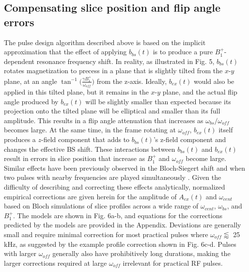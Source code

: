 \documentclass{article}
\newcommand{\bext}{b_{ex}(t)}
\newcommand{\bbst}{b_{bs}(t)}
\begin{document}
\subsection{Compensating slice position and flip angle errors}
The pulse design algorithm described above is based on the implicit approximation
that the effect of applying $\bbst$ is to produce a pure $B_1^+$-dependent 
resonance frequency shift.
In reality, as illustrated in Fig. 5, 
$\bbst$ rotates magnetization to precess in a plane that is slightly tilted from 
the $x$-$y$ plane, 
at an angle $\tan^{-1}\Big(\frac{\gamma B_1^+}{\omega_{off}}\Big)$ from the z-axis. 
Ideally, $\bext$ would also be applied in this tilted plane,
but it remains in the $x$-$y$ plane,
and the actual flip angle produced by $\bext$ will be slightly smaller than expected
because its projection onto the tilted plane will be elliptical and smaller than its full amplitude.
This results in a flip angle attenuation that increases as $\omega_{bs}/\omega_{off}$ becomes large.
At the same time, in the frame rotating at $\omega_{off}$, 
$\bext$ itself produces a $z$-field component that adds to 
$\bbst$'s z-field component and changes the effective BS shift.
These interactions between $\bbst$ and $\bext$ result
in errors in slice position that increase as $B_1^+$ and $\omega_{off}$ become large.
Similar effects have been previously observed in the Bloch-Siegert shift \cite{Hannaford1973AnalyticalShift}
and when two pulses with nearby frequencies are played simultaneously \cite{Mccoy1993SelectiveDecoupling, Steffen2000}.
Given the difficulty of describing and correcting these effects analytically, 
normalized empirical corrections are given herein for the amplitude of $A_{ex}(t)$ and $\omega_{cent}$ based on Bloch simulations of  slice profiles across a wide range of $\omega_{cent}$, $\omega_{bs}$, and $B_1^+$. 
The models are shown in Fig. 6a-b, 
and equations for the corrections predicted by the models are provided in the Appendix. 
Deviations are generally small and require minimal correction for most practical pulses where 
$\omega_{off} \lessapprox$ 25 kHz, as suggested by the example profile correction shown in Fig. 6c-d. 
Pulses with larger $\omega_{off}$ generally also have prohibitively long durations, 
making the larger corrections required at large $\omega_{off}$ irrelevant for practical RF pulses. 
\end{document}
